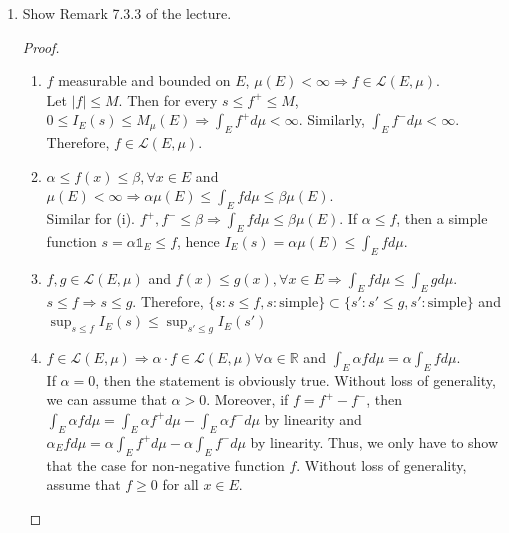 \documentclass{article}
\begin{document}
\begin{enumerate}[font = \Large\bfseries\itshape\space, leftmargin = 3mm, labelsep = 3mm]
\begin{proof}
By lemma, without loss of generality, let assume $E_i$'s be disjoint and $B_j$ be disjoint.
Let $A_{ij} = E_i \cap B_j$ so that $A_{ij}$ be disjoint, $\bigcup_{j=1}^m A_{ij} = E_i$, and $\bigcup_{i=1}^n A_{ij} = B_j$.
Then, there exists $\gamma_{ij}$ and $\delta_{ij}$ such that $s = \sum_{i=1}^n\sum_{j=1}^m \gamma_{ij} \mathbb{1}_{A_{ij}}, \tilde{s} = \sum_{i=1}^n\sum_{j=1}^m \delta_{ij} \mathbb{1}_{A_{ij}}$.
Since $(0 \leq) s \leq \tilde{s}$ and each $A_{ij}$ are disjoint, $\gamma_{ij} \leq \delta_{ij}$ for each $i, j$.
Therefore, $I_E(s) = I_E\left(\sum_{i=1}^n \sum_{j=1}^m \gamma_{ij} \mathbb{1}_{A_{ij}}\right) \leq I_E(\tilde{s}) = I_E\left(\sum_{i=1}^n \sum_{j=1}^m \delta_{ij} \mathbb{1}_{A_{ij}}\right)$.
\end{proof}

\item
Show Remark 7.3.3 of the lecture.
\begin{proof}
\begin{enumerate}[label=(\roman*)]
\item
$f$ measurable and bounded on $E$, $\mu(E) < \infty \Rightarrow f \in \mathcal{L}(E,\mu)$.\\
Let $|f| \leq M$. Then for every $s \leq f^+ \leq M$, $0 \leq I_E(s) \leq M_\mu(E) \Rightarrow \int_E f^+d\mu < \infty$.
Similarly, $\int_E f^- d\mu < \infty$.
Therefore, $f \in \mathcal{L}(E, \mu)$.

\item
$\alpha \leq f(x) \leq \beta, \forall x \in E$ and $\mu(E) < \infty \Rightarrow \alpha \mu(E) \leq \int_E fd\mu \leq \beta \mu(E)$.\\
Similar for (i).
$f^+, f^- \leq \beta \Rightarrow \int_E f d\mu \leq \beta \mu(E)$.
If $\alpha \leq f$, then a simple function $s = \alpha \mathbb{1}_{E} \leq f$, hence $I_E(s) = \alpha \mu(E) \leq \int_E fd\mu$.

\item
$f, g \in \mathcal{L}(E,\mu)$ and $f(x) \leq g(x), \forall x \in E \Rightarrow \int_E fd\mu \leq \int_E gd\mu$.\\
$s \leq f \Rightarrow s \leq g$.
Therefore, $\{ s : s \leq f, s: \text{simple}\} \subset \{ s' : s' \leq g, s': \text{simple} \}$ and $\sup_{s\leq f} I_E(s) \leq \sup_{s' \leq g} I_E(s')$

\item
$f \in \mathcal{L}(E,\mu) \Rightarrow \alpha \cdot f \in \mathcal{L}(E,\mu) \forall \alpha \in \mathbb{R}$ and $\int_E \alpha fd\mu = \alpha \int_E fd\mu$.\\
If $\alpha = 0$, then the statement is obviously true.
Without loss of generality, we can assume that $\alpha > 0$.
Moreover, if $f = f^+ - f^-$, then $\int_E \alpha f d\mu = \int_E \alpha f^+ d\mu - \int_E \alpha f^- d\mu$ by linearity and $\alpha_E fd\mu = \alpha \int_E f^+ d\mu - \alpha \int_E f^- d\mu$ by linearity.
Thus, we only have to show that the case for non-negative function $f$.
Without loss of generality, assume that $f \geq 0$ for all $x \in E$.


\end{enumerate}
\end{proof}
\end{enumerate}
\end{document}
